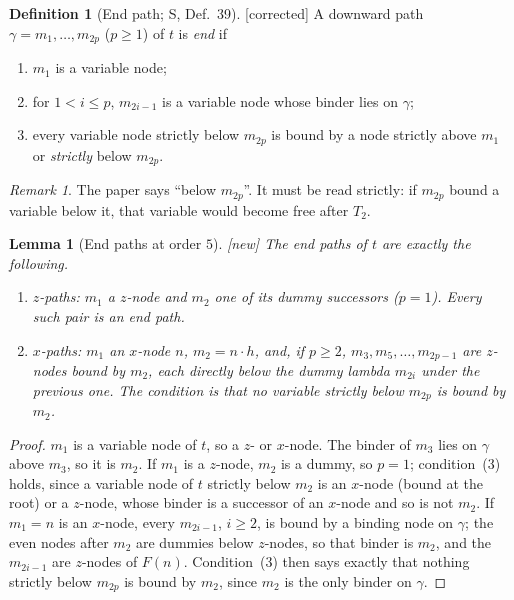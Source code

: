 \documentclass[11pt]{article}
\newcommand{\suc}[2]{#1{\cdot}#2}
\newcommand{\Fixed}{\textsf{[corrected]}}
\newcommand{\New}{\textsf{[new]}}
\theoremstyle{plain}
\newtheorem{lemma}[theorem]{Lemma}
\theoremstyle{definition}
\newtheorem{definition}[theorem]{Definition}
\theoremstyle{remark}
\newtheorem{remark}[theorem]{Remark}
\begin{document}
\begin{definition}[End path; S, Def.~39]\label{def:endpath}
\Fixed{} A downward path $\gamma=m_1,\dots,m_{2p}$ ($p\ge1$) of $t$ is
\emph{end} if
\begin{enumerate}
\item $m_1$ is a variable node;
\item for $1<i\le p$, $m_{2i-1}$ is a variable node whose binder lies on
  $\gamma$;
\item every variable node strictly below $m_{2p}$ is bound by a node
  strictly above $m_1$ or \emph{strictly} below $m_{2p}$.
\end{enumerate}
\end{definition}

\begin{remark}
The paper says ``below $m_{2p}$''.  It must be read strictly: if
$m_{2p}$ bound a variable below it, that variable would become free after
$T_2$.
\end{remark}

\begin{lemma}[End paths at order $5$]\label{lem:endpath5}
\New{} The end paths of $t$ are exactly the following.
\begin{enumerate}
\item \emph{$z$-paths}: $m_1$ a $z$-node and $m_2$ one of its dummy
  successors ($p=1$).  Every such pair is an end path.
\item \emph{$x$-paths}: $m_1$ an $x$-node $n$, $m_2=\suc nh$, and, if
  $p\ge2$, $m_3,m_5,\dots,m_{2p-1}$ are $z$-nodes bound by $m_2$, each
  directly below the dummy lambda $m_{2i}$ under the previous one.  The
  condition is that no variable strictly below $m_{2p}$ is bound by
  $m_2$.
\end{enumerate}
\end{lemma}
\begin{proof}
$m_1$ is a variable node of $t$, so a $z$- or $x$-node.  The binder of
$m_3$ lies on $\gamma$ above $m_3$, so it is $m_2$.  If $m_1$ is a
$z$-node, $m_2$ is a dummy, so $p=1$; condition~(3) holds, since a
variable node of $t$ strictly below $m_2$ is an $x$-node (bound at the
root) or a $z$-node, whose binder is a successor of an $x$-node and so is
not $m_2$.  If $m_1=n$ is an $x$-node, every $m_{2i-1}$, $i\ge2$, is bound
by a binding node on $\gamma$; the even nodes after $m_2$ are dummies
below $z$-nodes, so that binder is $m_2$, and the $m_{2i-1}$ are
$z$-nodes of $F(n)$.  Condition~(3) then says exactly that nothing
strictly below $m_{2p}$ is bound by $m_2$, since $m_2$ is the only
binder on $\gamma$.
\end{proof}
\end{document}
